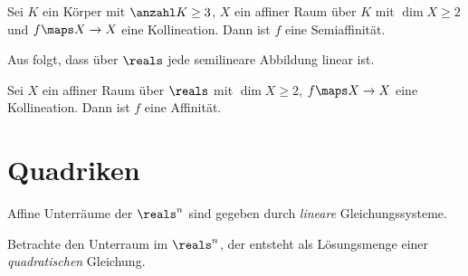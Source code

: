 Sei \( K \) ein Körper mit \( \anzahl K\geq 3 \), \( X \) ein affiner Raum über \( K \) mit \( \dim X\geq 2 \) und \( f\maps X\to X \) eine Kollineation. Dann ist \( f \) eine Semiaffinität.

\begin{bemerkung*}
    Aus  folgt, dass über \( \reals \) jede semilineare Abbildung linear ist.
\end{bemerkung*}
\begin{korollar*}
    Sei \( X \) ein affiner Raum über \( \reals \) mit \( \dim X\geq 2 \), \( f\maps X\to X \) eine Kollineation. Dann ist \( f \) eine Affinität.
\end{korollar*}

\section{Quadriken}
\begin{motivation*}
    Affine Unterräume der \( \reals^n \) sind gegeben durch \emph{lineare} Gleichungssysteme.
\end{motivation*}
Betrachte den Unterraum im \( \reals^n \), der entsteht als Lösungsmenge einer \emph{quadratischen} Gleichung.
